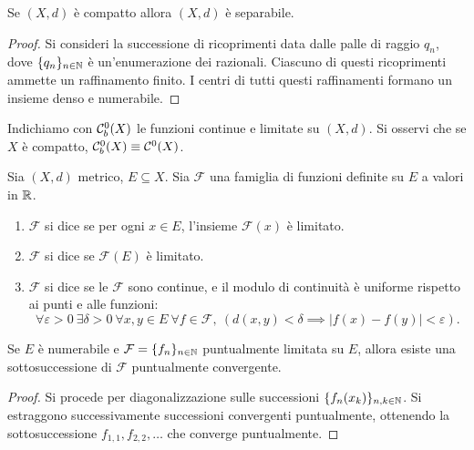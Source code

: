 \begin{corollary}
\label{cor:comp_implies_sep}
	Se $(X, d)$ è compatto allora $(X, d)$ è separabile.
\end{corollary}
\begin{proof}
	Si consideri la successione di ricoprimenti data dalle palle di raggio $q_n$, dove $\{q_n\}_{n \in \mathbb{N}}$ è un'enumerazione dei razionali. Ciascuno di questi ricoprimenti ammette un raffinamento finito.
	I centri di tutti questi raffinamenti formano un insieme denso e numerabile.
\end{proof}

Indichiamo con $\mathcal{C}^0_b(X)$ le funzioni continue e limitate su $(X,d)$. Si osservi che se $X$ è compatto, $\mathcal{C}^0_b(X) \equiv \mathcal{C}^0(X)$.

\begin{definition}
	Sia $(X,d)$ metrico, $E \subseteq X$.
	Sia $\mathcal F$ una famiglia di funzioni definite su $E$ a valori in $\mathbb{R}$.
	\begin{enumerate}
		\item $\mathcal F$ si dice  se per ogni $x \in E$, l'insieme $\mathcal F(x)$ è limitato.
		\item $\mathcal F$ si dice  se $\mathcal F(E)$ è limitato.
		\item $\mathcal F$ si dice  se le $\mathcal F$ sono continue, e il modulo di continuità è uniforme rispetto ai punti e alle funzioni:
		\begin{equation*}
			\forall \varepsilon > 0\ \exists \delta > 0\ \forall x,y \in E\ \forall f \in \mathcal F,\ (d(x,y) < \delta \implies |f(x) - f(y)| < \varepsilon).
		\end{equation*}
	\end{enumerate}
\end{definition}

\begin{lemma}
\label{lemma:funsp_three}
	Se $E$ è numerabile e $\mathcal F = \{f_n\}_{n \in \mathbb{N}}$ puntualmente limitata su $E$, allora esiste una sottosuccessione di $\mathcal F$ puntualmente convergente.
\end{lemma}
\begin{proof}
	Si procede per diagonalizzazione sulle successioni $\{f_n(x_k)\}_{n,k \in \mathbb{N}}$. Si estraggono successivamente successioni convergenti puntualmente, ottenendo la sottosuccessione $f_{1,1}, f_{2,2}, \ldots$ che converge puntualmente.
\end{proof}

